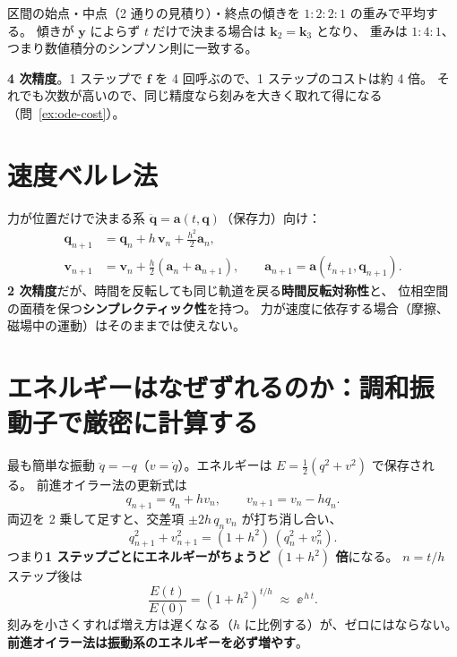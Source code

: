 \begin{intuition}
区間の始点・中点（2 通りの見積り）・終点の傾きを $1:2:2:1$ の重みで平均する。
傾きが $\mathbf y$ によらず $t$ だけで決まる場合は $\mathbf k_2=\mathbf k_3$ となり、
重みは $1:4:1$、つまり数値積分のシンプソン則に一致する。
\end{intuition}

\textbf{4 次精度}。1 ステップで $\mathbf f$ を 4 回呼ぶので、1 ステップのコストは約 4 倍。
それでも次数が高いので、同じ精度なら刻みを大きく取れて得になる
（問~\ref{ex:ode-cost}）。

\section{速度ベルレ法}\label{sec:verlet}

力が位置だけで決まる系 $\ddot{\mathbf q}=\mathbf a(t,\mathbf q)$（保存力）向け：
\begin{equation}
\begin{aligned}
  \mathbf q_{n+1}&=\mathbf q_n+h\,\mathbf v_n+\tfrac{h^2}{2}\mathbf a_n,\\
  \mathbf v_{n+1}&=\mathbf v_n+\tfrac h2\left(\mathbf a_n+\mathbf a_{n+1}\right),
  \qquad \mathbf a_{n+1}=\mathbf a(t_{n+1},\mathbf q_{n+1}).
\end{aligned}
\label{eq:verlet}
\end{equation}
\textbf{2 次精度}だが、時間を反転しても同じ軌道を戻る\textbf{時間反転対称性}と、
位相空間の面積を保つ\textbf{シンプレクティック性}を持つ。
力が速度に依存する場合（摩擦、磁場中の運動）はそのままでは使えない。

\section{エネルギーはなぜずれるのか：調和振動子で厳密に計算する}\label{sec:ode-energy}

最も簡単な振動 $\ddot q=-q$（$v=\dot q$）。エネルギーは $E=\tfrac12(q^2+v^2)$ で保存される。
前進オイラー法の更新式は
\begin{equation}
  q_{n+1}=q_n+h v_n,\qquad v_{n+1}=v_n-h q_n .
\end{equation}
両辺を 2 乗して足すと、交差項 $\pm2h\,q_nv_n$ が打ち消し合い、
\begin{equation}
  q_{n+1}^2+v_{n+1}^2=(1+h^2)\,(q_n^2+v_n^2).
  \label{eq:euler-factor}
\end{equation}
つまり\textbf{1 ステップごとにエネルギーがちょうど $(1+h^2)$ 倍}になる。
$n=t/h$ ステップ後は
\begin{equation}
  \frac{E(t)}{E(0)}=(1+h^2)^{t/h}\;\approx\;\ee^{\,h\,t}.
  \label{eq:euler-growth}
\end{equation}
刻みを小さくすれば増え方は遅くなる（$h$ に比例する）が、ゼロにはならない。
\textbf{前進オイラー法は振動系のエネルギーを必ず増やす}。

